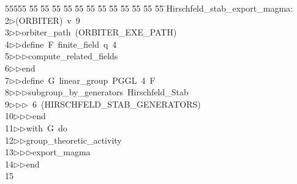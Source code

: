 %
%
\begin{tabbing}
55555 \= 55 \= 55 \= 55 \= 55 \= 55 \= 55 \= 55 \= 55 \= 55 \= 55 \= 55 \= 55 \= \>Hirschfeld\_stab\_export\_magma:\\[0pt]
2\>$\triangleright$\>(ORBITER)\ v\ 9\ \\[0pt]
3\>$\triangleright$\>$\triangleright$\>orbiter\_path\ (ORBITER\_EXE\_PATH)\ \\[0pt]
4\>$\triangleright$\>$\triangleright$\>define\ F\ finite\_field\ q\ 4\ \\[0pt]
5\>$\triangleright$\>$\triangleright$\>$\triangleright$\>compute\_related\_fields\ \\[0pt]
6\>$\triangleright$\>$\triangleright$\>end\ \\[0pt]
7\>$\triangleright$\>$\triangleright$\>define\ G\ linear\_group\ PGGL\ 4\ F\ \\[0pt]
8\>$\triangleright$\>$\triangleright$\>$\triangleright$\>subgroup\_by\_generators\ Hirschfeld\_Stab\ \\[0pt]
9\>$\triangleright$\>$\triangleright$\>$\triangleright$\ 6\ (HIRSCHFELD\_STAB\_GENERATORS)\ \\[0pt]
10\>$\triangleright$\>$\triangleright$\>$\triangleright$\>end\ \\[0pt]
11\>$\triangleright$\>$\triangleright$\>with\ G\ do\ \\[0pt]
12\>$\triangleright$\>$\triangleright$\>group\_theoretic\_activity\ \\[0pt]
13\>$\triangleright$\>$\triangleright$\>$\triangleright$\>export\_magma\ \\[0pt]
14\>$\triangleright$\>$\triangleright$\>end\\[0pt]
15\>\end{tabbing}

